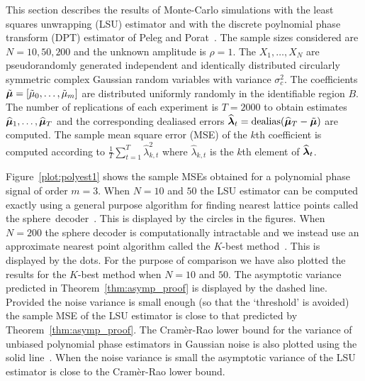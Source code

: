 \documentclass[journal]{IEEEtran}
\begin{document}

This section describes the results of Monte-Carlo simulations with the least squares unwrapping (LSU) estimator and with the discrete poylnomial phase transform (DPT) estimator of Peleg and Porat~\cite{Peleg_DPT_1995}.  The sample sizes considered are $N = 10, 50, 200$ and the unknown amplitude is $\rho = 1$.  The $X_1, \dots, X_N$ are pseudorandomly generated independent and identically distributed circularly symmetric complex Gaussian random variables with variance $\sigma_c^2$.  The coefficients $\tilde{\boldsymbol{\mu}} = [\tilde{\mu}_0, \dots, \tilde{\mu}_m]$ are distributed uniformly randomly in the identifiable region $B$.  The number of replications of each experiment is $T = 2000$ to obtain estimates $\widehat{\boldsymbol{\mu}}_1, \dots, \widehat{\boldsymbol{\mu}}_T$ and the corresponding dealiased errors $\widehat{\boldsymbol{\lambda}}_t = \operatorname{dealias}(\widehat{\boldsymbol{\mu}}_T - \tilde{\boldsymbol{\mu}})$ are computed.  The sample mean square error (MSE) of the $k$th coefficient is computed according to $\tfrac{1}{T}\sum_{t=1}^T \widehat{\lambda}_{k,t}^2$ where $\widehat{\lambda}_{k,t}$ is the $k$th element of $\widehat{\boldsymbol{\lambda}}_t$. 

Figure~\ref{plot:polyest1} shows the sample MSEs obtained for a polynomial phase signal of order $m=3$.  %
When $N = 10$ and $50$ the LSU estimator can be computed exactly using a general purpose algorithm for finding nearest lattice points called the sphere~decoder~\cite{Pohst_sphere_decoder_1981,Agrell2002,Viterbo_sphere_decoder_1999}.  This is displayed by the circles in the figures.  When $N=200$ the sphere decoder is computationally intractable and we instead use an approximate nearest point algorithm called the $K$-best method~\cite{Zhan2006_K_best_sphere_decoder}.  This is displayed by the dots.  For the purpose of comparison we have also plotted the results for the $K$-best method when $N = 10$ and $50$.  The asymptotic variance predicted in Theorem~\ref{thm:asymp_proof} is displayed by the dashed line.  Provided the noise variance is small enough (so that the `threshold' is avoided) the sample MSE of the LSU estimator is close to that predicted by Theorem~\ref{thm:asymp_proof}.  The Cram\`{e}r-Rao lower bound for the variance of unbiased polynomial phase estimators in Gaussian noise is also plotted using the solid line~\cite{Peleg1991_CRB_PPS_1991}.  When the noise variance is small the asymptotic variance of the LSU estimator is close to the Cram\`{e}r-Rao lower bound.  
 
\end{document}
